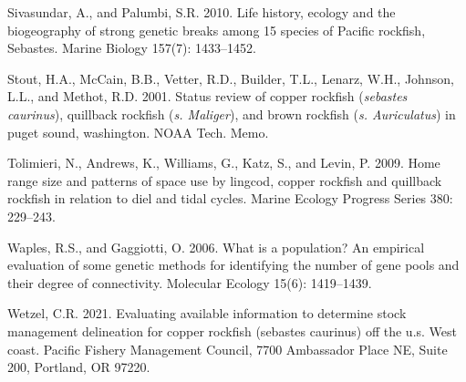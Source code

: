 \documentclass[11pt,
  english,
  letterpaper,
]{article}
\begin{document}
\leavevmode\hypertarget{ref-sivasundar_life_2010}{}%
Sivasundar, A., and Palumbi, S.R. 2010. Life history, ecology and the biogeography of strong genetic breaks among 15 species of Pacific rockfish, Sebastes. Marine Biology 157(7): 1433--1452.

\leavevmode\hypertarget{ref-Stoutetal_DPS_2001}{}%
Stout, H.A., McCain, B.B., Vetter, R.D., Builder, T.L., Lenarz, W.H., Johnson, L.L., and Methot, R.D. 2001. Status review of copper rockfish (\emph{sebastes caurinus}), quillback rockfish (\emph{s. Maliger}), and brown rockfish (\emph{s. Auriculatus}) in puget sound, washington. NOAA Tech. Memo.

\leavevmode\hypertarget{ref-tolimieri_home_2009}{}%
Tolimieri, N., Andrews, K., Williams, G., Katz, S., and Levin, P. 2009. Home range size and patterns of space use by lingcod, copper rockfish and quillback rockfish in relation to diel and tidal cycles. Marine Ecology Progress Series 380: 229--243.

\leavevmode\hypertarget{ref-waples_what_2006}{}%
Waples, R.S., and Gaggiotti, O. 2006. What is a population? An empirical evaluation of some genetic methods for identifying the number of gene pools and their degree of connectivity. Molecular Ecology 15(6): 1419--1439.

\leavevmode\hypertarget{ref-Wetzel_copper_area_2021}{}%
Wetzel, C.R. 2021. Evaluating available information to determine stock management delineation for copper rockfish (sebastes caurinus) off the u.s. West coast. Pacific Fishery Management Council, 7700 Ambassador Place NE, Suite 200, Portland, OR 97220.

\leavevmode\tagmcend\tagstructend
\end{document}
